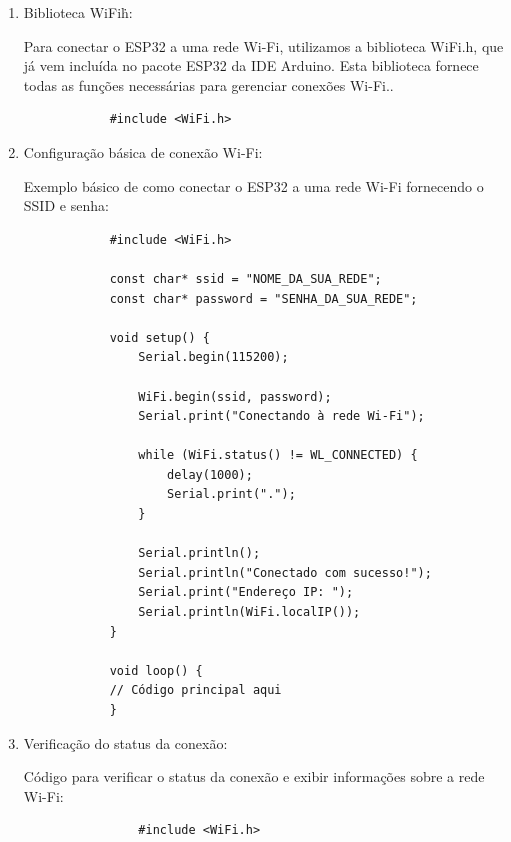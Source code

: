 \documentclass[a4paper]{article}
\begin{document}
    \begin{answer}
        \begin{enumerate}
            \item Biblioteca WiFi\.h:
            
            Para conectar o ESP32 a uma rede Wi-Fi, utilizamos a biblioteca WiFi.h, que já vem incluída no pacote ESP32 da IDE Arduino. Esta biblioteca fornece todas as funções necessárias para gerenciar conexões Wi-Fi..

            \begin{verbatim}
            #include <WiFi.h>
            \end{verbatim}

            \item Configuração básica de conexão Wi-Fi:

                Exemplo básico de como conectar o ESP32 a uma rede Wi-Fi fornecendo o SSID e senha:

            \begin{verbatim}
            #include <WiFi.h>

            const char* ssid = "NOME_DA_SUA_REDE";
            const char* password = "SENHA_DA_SUA_REDE";

            void setup() {
                Serial.begin(115200);

                WiFi.begin(ssid, password);
                Serial.print("Conectando à rede Wi-Fi");

                while (WiFi.status() != WL_CONNECTED) {
                    delay(1000);
                    Serial.print(".");
                }

                Serial.println();
                Serial.println("Conectado com sucesso!");
                Serial.print("Endereço IP: ");
                Serial.println(WiFi.localIP());
            }

            void loop() {
            // Código principal aqui
            }

            \end{verbatim}
        
            \item Verificação do status da conexão:

                Código para verificar o status da conexão e exibir informações sobre a rede Wi-Fi:
            \begin{verbatim}
                #include <WiFi.h>


\end{verbatim}
\end{enumerate}
\end{answer}
\end{document}
